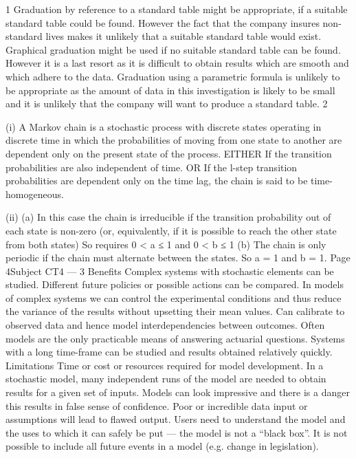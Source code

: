 1
Graduation by reference to a standard table might be appropriate, if a suitable
standard table could be found.
However the fact that the company insures non-standard lives makes it unlikely that a
suitable standard table would exist.
Graphical graduation might be used if no suitable standard table can be found.
However it is a last resort as it is difficult to obtain results which are smooth and
which adhere to the data.
Graduation using a parametric formula is unlikely to be appropriate as the amount of
data in this investigation is likely to be small and it is unlikely that the company will
want to produce a standard table.
2
\item (i)
A Markov chain is a stochastic process with discrete states operating in
discrete time in which the probabilities of moving from one state to another
are dependent only on the present state of the process.
EITHER
If the transition probabilities are also independent of time.
OR
If the l-step transition probabilities are dependent only on the time lag, the
chain is said to be time-homogeneous.
\item (ii)
(a)
In this case the chain is irreducible if the transition probability
out of each state is non-zero (or, equivalently, if it is possible to
reach the other state from both states)
So requires 0 < a ≤ 1 and 0 < b ≤ 1
(b)
The chain is only periodic if the chain must alternate between
the states.
So a = 1 and b = 1.
Page 4Subject CT4 — %
3
Benefits
Complex systems with stochastic elements can be studied.
Different future policies or possible actions can be compared.
In models of complex systems we can control the experimental conditions and thus
reduce the variance of the results without upsetting their mean values.
Can calibrate to observed data and hence model interdependencies between
outcomes.
Often models are the only practicable means of answering actuarial questions.
Systems with a long time-frame can be studied and results obtained relatively quickly.
Limitations
Time or cost or resources required for model development.
In a stochastic model, many independent runs of the model are needed to obtain
results for a given set of inputs.
Models can look impressive and there is a danger this results in false sense of
confidence.
Poor or incredible data input or assumptions will lead to flawed output.
Users need to understand the model and the uses to which it can safely be put — the
model is not a “black box”.
It is not possible to include all future events in a model (e.g. change in legislation).
